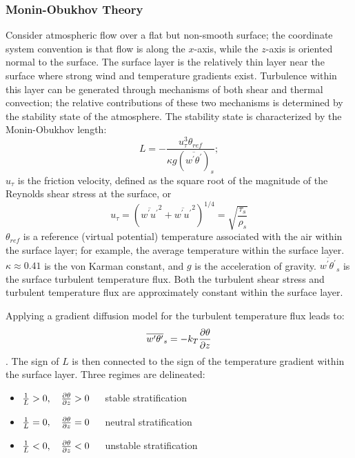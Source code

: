 \subsubsection{Monin-Obukhov Theory}
Consider atmospheric flow over a flat but non-smooth surface; the
coordinate system convention is that flow is along the $x$-axis, while
the $z$-axis is oriented normal to the surface.  The surface layer is
the relatively thin layer near the surface where strong wind and
temperature gradients exist.  Turbulence within this layer can be
generated through mechanisms of both shear and thermal convection; the
relative contributions of these two mechanisms is determined by the
stability state of the atmosphere.  The stability state is
characterized by the Monin-Obukhov length:
\begin{equation}
 L = - \frac{u_\tau^3 \theta_{ref}}{\kappa g (\overline{w^\prime
     \theta^\prime})_s};
\end{equation}
$u_\tau$ is the friction velocity, defined as the
square root of the magnitude of the Reynolds shear stress at
the surface, or
\begin{equation}
 u_\tau = \left( \overline{w^\prime u^\prime}^2 + \overline{w^\prime
   u^\prime}^2 \right)^{1/4} = \sqrt{\frac{\tau_s}{\rho_s}}
\end{equation}
$\theta_{ref}$ is a reference (virtual potential) temperature associated with the air
within the surface layer; for example, the average temperature within
the surface layer.  $\kappa \approx 0.41$ is the von Karman constant,
and $g$ is the acceleration of gravity.  $\overline{w^\prime
     \theta^\prime}_s$ is the surface turbulent temperature flux.  Both the
turbulent shear stress and turbulent temperature flux are approximately
constant within the surface layer.

Applying a gradient diffusion model for the turbulent temperature flux leads to:
\begin{equation}
 \overline{w^\prime \theta^\prime}_s = -k_T \frac{\partial{\theta}}{\partial{z}}
\end{equation}.
The sign of $L$ is then connected to the sign of the temperature
gradient within the surface layer.  Three regimes are delineated:
\begin{itemize}
  \item $\frac{1}{L} > 0, \quad \frac{\partial{\theta}}{\partial{z}} > 0$~~~stable
    stratification
  \item $\frac{1}{L} = 0, \quad \frac{\partial{\theta}}{\partial{z}} = 0$~~~neutral
    stratification
  \item $\frac{1}{L} < 0, \quad \frac{\partial{\theta}}{\partial{z}} < 0$~~~unstable stratification
\end{itemize}

